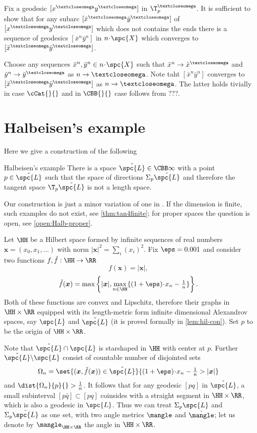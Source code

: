 Fix a geodesic $[x^\o y^\o]$ in $\T^\o_p$.
It is sufficient to show that for any subarc $[\bar x^\o \bar y^\o]$ of $[x^\o y^\o]$
which does not contains the ends
there is a sequence of geodesics $[\bar x^n\bar y^n]$ in $n\cdot \spc{X}$ which converges to $[\bar x^\o\bar y^\o]$.

Choose any sequences $\bar x^n,\bar y^n\in n\cdot \spc{X}$ such that $\bar x^n\to \bar x^\o$ and $\bar y^n\to \bar y^\o$ as $n\to\o$.
Note taht $[\bar x^n \bar y^n]$ 
converges to $[\bar x^\o \bar y^\o]$
as $n\to\o$.
The latter holds tivially in case $\cCat{}{}$
and in $\CBB{}{}$ case follows from ???.
\qeds



\section{Halbeisen's example}\label{halbeisen}

Here we give a construction of the following

\begin{thm}{Halbeisen's example}\label{Halbeisen's example}
There is a space $\check{\spc{L}}\in\CBB\infty{}$
with a point $p\in\check{\spc{L}}$ such that the space of directions $\Sigma_p\check{\spc{L}}$ and therefore the tangent space $\T_p\check{\spc{L}}$ is not a length space. 
\end{thm}

Our construction is just a minor variation of one in \cite{halbeisen}.
If the dimension is finite, such examples do not exist, see \ref{thm:tan4finite}; 
for proper spaces the question is open, see \ref{open:Halb-proper}.

Let $\HH$ be a Hilbert space formed by infinite sequences of real numbers $\bm{x}=(x_0,x_1,\dots)$ with norm
$|\bm{x}|^2=\sum_i(x_i)^2$. 
Fix $\eps=0.001$ and consider two functions $f,\check f:\HH\to\RR$
\[f(\bm{x})=|\bm{x}|,\]
\[\check f(\bm{x})
=
\max\left\{|\bm{x}|,\max_{n\in\NN}\{(1+\eps)\cdot x_n-\tfrac{1}{n}\}\right\}.\] 
Both of these functions are convex and Lipschitz, therefore their graphs in $\HH\times \RR$ equipped with its length-metric form infinite dimensional Alexandrov spaces, say $\spc{L}$  and $\check{\spc{L}}$ (it is proved formally in \ref{lem:hil-con}).
Set $p$ to be the origin of $\HH\times \RR$.

Note that $\check{\spc{L}}\cap\spc{L}$ is starshaped in $\HH$ with center at $p$.
Further $\check{\spc{L}}\backslash\spc{L}$ consist of countable number of disjointed sets
\[\Omega_n=\set{(\bm{x},\check f(\bm{x}))\in\check{\spc{L}}}{(1+\eps)\cdot x_n-\tfrac{1}{n}>|\bm{x}|}\]
and $\dist{\Omega_n}{p}{}>\tfrac{1}{n}$.
It follows that for any geodesic $[p q]$ in $\check{\spc{L}}$,
a small subinterval $[p \bar q]\subset [p q]$ 
coinsides with a straight segment in $\HH\times\RR$, 
which is also a geodesic in $\spc{L}$.
Thus we can treat $\Sigma_p\spc{L}$ and $\Sigma_p\check{\spc{L}}$ as one set, with two angle metrics $\mangle$ and $\check\mangle$;
let us denote by $\mangle_{\HH\times \RR}$ the angle in $\HH\times\RR$.


